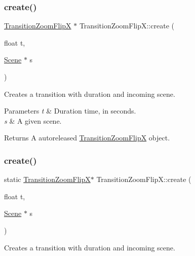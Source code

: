 \subsubsection{\texorpdfstring{create()}{create()}\hspace{0.1cm}{\footnotesize\ttfamily [3/4]}}
{\footnotesize\ttfamily \hyperlink{classTransitionZoomFlipX}{Transition\+Zoom\+FlipX} $\ast$ Transition\+Zoom\+Flip\+X\+::create (\begin{DoxyParamCaption}\item[{float}]{t,  }\item[{\hyperlink{classScene}{Scene} $\ast$}]{s }\end{DoxyParamCaption})\hspace{0.3cm}{\ttfamily [static]}}

Creates a transition with duration and incoming scene.


\begin{DoxyParams}{Parameters}
{\em t} & Duration time, in seconds. \\
\hline
{\em s} & A given scene. \\
\hline
\end{DoxyParams}
\begin{DoxyReturn}{Returns}
A autoreleased \hyperlink{classTransitionZoomFlipX}{Transition\+Zoom\+FlipX} object. 
\end{DoxyReturn}
\mbox{\label{classTransitionZoomFlipX_a2b24028b848f3c8e2a43eb3d02e1d628}} 
\subsubsection{\texorpdfstring{create()}{create()}\hspace{0.1cm}{\footnotesize\ttfamily [4/4]}}
{\footnotesize\ttfamily static \hyperlink{classTransitionZoomFlipX}{Transition\+Zoom\+FlipX}$\ast$ Transition\+Zoom\+Flip\+X\+::create (\begin{DoxyParamCaption}\item[{float}]{t,  }\item[{\hyperlink{classScene}{Scene} $\ast$}]{s }\end{DoxyParamCaption})\hspace{0.3cm}{\ttfamily [static]}}

Creates a transition with duration and incoming scene.


